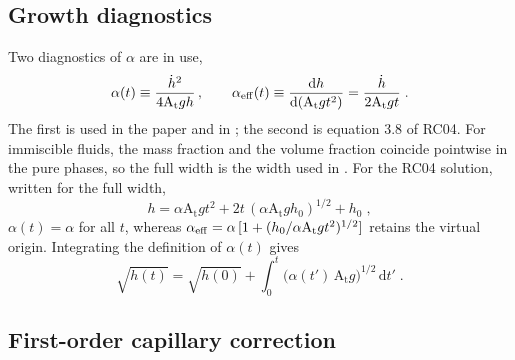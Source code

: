 \documentclass[11pt]{article}
\newcommand{\At}{\mathrm{A_t}}
\newcommand{\hd}{\dot h}
\begin{document}
\subsection{Growth diagnostics}\label{sec:diagnostics}

Two diagnostics of $\alpha$ are in use,
\begin{equation}
  \alpha(t) \equiv \frac{\hd^2}{4 \At g h} \, , \qquad \alpha_{\rm eff}(t) \equiv \frac{\mathrm d h}{\mathrm d (\At g t^2)} = \frac{\hd}{2 \At g t} \;.
  \label{eq:alpha_defs}
\end{equation}
The first is used in the paper and in \citet{Walker2026,Walker2027_1}; the second is equation 3.8 of RC04. For immiscible fluids, the mass fraction and the volume fraction coincide pointwise in the pure phases, so the full width is the width used in \citet{Walker2026,Walker2027_1}. For the RC04 solution, written for the full width,
\begin{equation}
  h = \alpha \At g t^2 + 2 t \,(\alpha \At g h_0)^{1/2} + h_0 \;,
  \label{eq:rc_solution}
\end{equation}
$\alpha(t) = \alpha$ for all $t$, whereas $\alpha_{\rm eff} = \alpha \,[1 + (h_0/\alpha \At g t^2)^{1/2}]$ retains the virtual origin. Integrating the definition of $\alpha(t)$ gives
\begin{equation}
  \sqrt{h(t)} = \sqrt{h(0)} + \int_0^t \big(\alpha(t') \, \At g\big)^{1/2} \, \mathrm d t' \;.
  \label{eq:sqrt_h}
\end{equation}

\subsection{First-order capillary correction}\label{sec:firstorder}
\end{document}
